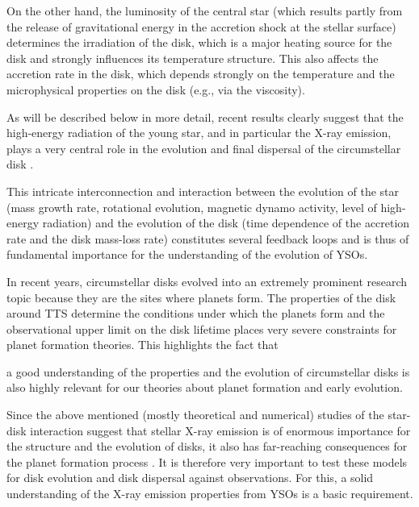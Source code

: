 \documentclass[10pt,fleqn,twoside]{article}
\begin{document}
On the other hand, the
 luminosity of the central star (which results 
partly from the
release of gravitational energy in the accretion shock at the stellar surface) 
determines the irradiation of the disk,
which is a major heating source for the disk and strongly
influences its temperature structure. This also affects the accretion rate in the
disk, which depends strongly on the
 temperature and the
microphysical properties on the disk (e.g., via the viscosity).


As will be described below in more detail, recent results clearly suggest that the
high-energy radiation of the young star, and in particular the X-ray emission,
 plays a very central role in the evolution
and final dispersal of the circumstellar disk
\citep{Ercolano08a,Ercolano08b,Ercolano09,Owen10,Owen11,Owen12}.



%
This intricate interconnection and interaction between the evolution of the star 
(mass growth rate, rotational evolution, magnetic dynamo activity, level
of high-energy radiation)
and the evolution of the disk (time dependence of the accretion rate
and the disk mass-loss rate)
constitutes several feedback loops and is thus 
of fundamental importance for the understanding of the
evolution of YSOs.


\medskip

In recent years,
circumstellar disks evolved into an extremely prominent research topic 
because they are the sites where planets form. 
The properties of the disk around TTS determine the conditions 
under which the planets form and the observational upper limit on the
disk lifetime places very severe constraints for planet formation 
theories.
This highlights the fact that
\begin{highlight}
a good understanding of the properties and the evolution of circumstellar disks is also 
highly relevant for our theories about planet formation and early evolution.
\end{highlight}


Since the above mentioned (mostly theoretical and numerical) studies
of the star-disk interaction
suggest that stellar X-ray emission is of enormous 
importance for the structure and the evolution of disks, it also
has far-reaching consequences for the planet formation process
\citep{ER15,2013MNRAS.430.1392R, Rosotti15}.
%
It is therefore very important to test these models for disk evolution and disk dispersal
against observations.
For this, a solid understanding of the X-ray
emission properties from YSOs is a basic requirement.
\end{document}
